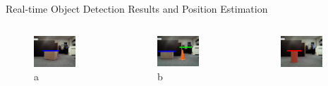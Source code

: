 \documentclass[10pt]{beamer}
\begin{document}
\begin{frame}{Real-time Object Detection Results and Position Estimation}
\begin{columns}
     \begin{figure}
         \centering
         \includegraphics[width=0.8\textwidth]{Images/Box_d100cm.PNG}
         \caption{a}
     \end{figure}
     \vspace{-20pt}
     \begin{figure}
         \centering
         \includegraphics[width=0.8\textwidth]{Images/box_d120cm_py_d105cm.PNG}
         \caption{b}
     \end{figure}  
     \begin{figure}
         \centering
         \includegraphics[width=0.8\textwidth]{Images/cy_d80cm.PNG}

\end{figure}
\end{columns}
\end{frame}
\end{document}

